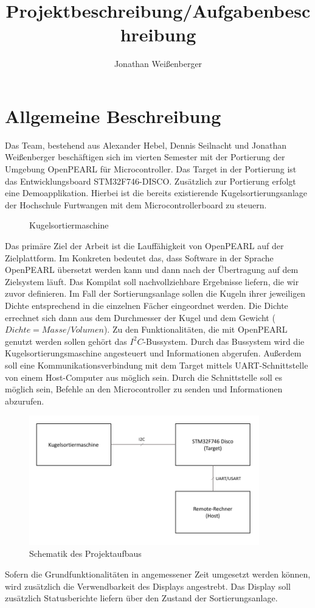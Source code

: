 \documentclass[12pt,a4paper]{article}
\author{Jonathan Weißenberger}
\title{Projektbeschreibung/Aufgabenbeschreibung}
\begin{document}
\maketitle
\newpage
\tableofcontents
\newpage
\section{Allgemeine Beschreibung}
Das Team, bestehend aus Alexander Hebel, Dennis Seilnacht und Jonathan Weißenberger beschäftigen sich im vierten Semester mit der Portierung der Umgebung OpenPEARL für Microcontroller. Das Target in der Portierung ist das Entwicklungsboard STM32F746-DISCO. Zusätzlich zur Portierung erfolgt eine Demoapplikation. Hierbei ist die bereits existierende Kugelsortierungsanlage der Hochschule Furtwangen mit dem Microcontrollerboard zu steuern.
\begin{figure}[h]
\begin{center}
\caption{Kugelsortiermaschine}
\label{bild_kugelsortiermaschine}
\end{center}
\end{figure}

Das primäre Ziel der Arbeit ist die Lauffähigkeit von OpenPEARL auf der Zielplattform. Im Konkreten bedeutet das, dass Software in der Sprache OpenPEARL übersetzt werden kann und dann nach der Übertragung auf dem Zielsystem läuft. Das Kompilat soll nachvollziehbare Ergebnisse liefern, die wir zuvor definieren. Im Fall der Sortierungsanlage sollen die Kugeln ihrer jeweiligen Dichte entsprechend in die einzelnen Fächer eingeordnet werden. Die Dichte errechnet sich dann aus dem Durchmesser der Kugel und dem Gewicht ($Dichte=Masse/Volumen$). Zu den Funktionalitäten, die mit OpenPEARL genutzt werden sollen gehört das $I^2C$-Bussystem. Durch das Bussystem wird die Kugelsortierungsmaschine angesteuert und Informationen abgerufen. Außerdem soll eine Kommunikationsverbindung mit dem Target mittels UART-Schnittstelle von einem Host-Computer aus möglich sein. Durch die Schnittstelle soll es möglich sein, Befehle an den Microcontroller zu senden und Informationen abzurufen. 
\begin{figure}[h]
\begin{center}
\includegraphics[width=10cm]{grafiken/Schematik.png}
\caption{Schematik des Projektaufbaus}
\label{schematik_projektaufbau}
\end{center}
\end{figure}
Sofern die Grundfunktionalitäten in angemessener Zeit umgesetzt werden können, wird zusätzlich die Verwendbarkeit des Displays angestrebt. Das Display soll zusätzlich Statusberichte liefern über den Zustand der Sortierungsanlage. 
\end{document}
